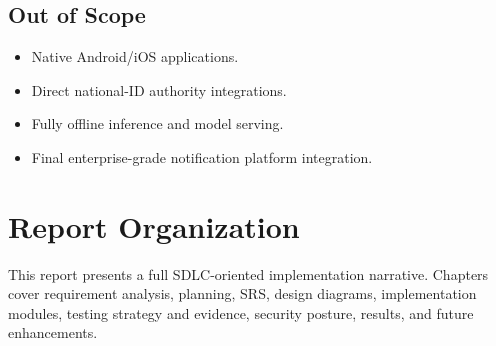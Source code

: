 \subsection{Out of Scope}
\begin{itemize}
\item Native Android/iOS applications.
\item Direct national-ID authority integrations.
\item Fully offline inference and model serving.
\item Final enterprise-grade notification platform integration.
\end{itemize}

\section{Report Organization}
This report presents a full SDLC-oriented implementation narrative. Chapters cover requirement analysis, planning, SRS, design diagrams, implementation modules, testing strategy and evidence, security posture, results, and future enhancements.
